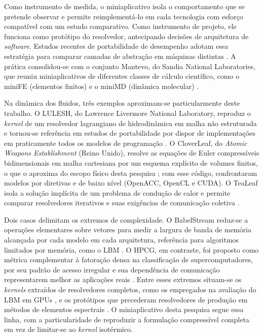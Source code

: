 Como instrumento de medida, o miniaplicativo isola o comportamento que se pretende observar e permite reimplementá-lo em cada tecnologia com esforço compatível com um estudo comparativo.
Como instrumento de projeto, ele funciona como protótipo do resolvedor, antecipando decisões de arquitetura de \textit{software}.
Estudos recentes de portabilidade de desempenho adotam essa estratégia para comparar camadas de abstração em máquinas distintas \parencite{Davis2023}.
A prática consolidou-se com o conjunto Mantevo, do Sandia National Laboratories, que reuniu miniaplicativos de diferentes classes de cálculo científico, como o miniFE (elementos finitos) e o miniMD (dinâmica molecular) \parencite{Heroux2009}.

Na dinâmica dos fluidos, três exemplos aproximam-se particularmente deste trabalho.
O LULESH, do Lawrence Livermore National Laboratory, reproduz o \textit{kernel} de um resolvedor lagrangiano de hidrodinâmica em malha não estruturada e tornou-se referência em estudos de portabilidade por dispor de implementações em praticamente todos os modelos de programação \parencite{Karlin2013}.
O CloverLeaf, do \textit{Atomic Weapons Establishment} (Reino Unido), resolve as equações de Euler compressíveis bidimensionais em malha cartesiana por um esquema explícito de volumes finitos, o que o aproxima do escopo físico desta pesquisa \parencite{Mallinson2013}; com esse código, \textcite{Herdman2012} confrontaram modelos por diretivas e de baixo nível (OpenACC, OpenCL e CUDA)\@.
O TeaLeaf isola a solução implícita de um problema de condução de calor e permite comparar resolvedores iterativos e suas exigências de comunicação coletiva \parencite{McIntoshSmith2017}.

Dois casos delimitam os extremos de complexidade.
O BabelStream reduz-se a operações elementares sobre vetores para medir a largura de banda de memória alcançada por cada modelo em cada arquitetura, referência para algoritmos limitados por memória, como o LBM \parencite{Deakin2018}.
O HPCG, em contraste, foi proposto como métrica complementar à fatoração densa na classificação de supercomputadores, por seu padrão de acesso irregular e sua dependência de comunicação representarem melhor as aplicações reais \parencite{Dongarra2016}.
Entre esses extremos situam-se os \textit{kernels} extraídos de resolvedores completos, como os empregados na avaliação do LBM em GPUs \parencite{Tomczak2021, Ma2023}, e os protótipos que precederam resolvedores de produção em métodos de elementos espectrais \parencite{Jansson2024}.
O miniaplicativo desta pesquisa segue essa linha, com a particularidade de reproduzir a formulação compressível completa em vez de limitar-se ao \textit{kernel} isotérmico.

